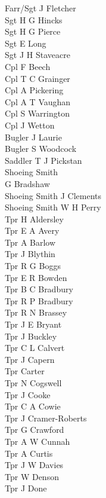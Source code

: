 \begin{multicols}{3}
  \small
  \noindent
  Farr/Sgt J Fletcher \\
  Sgt H G Hincks \\
  Sgt H G Pierce \\
  Sgt E Long \\
  Sgt J H Staveacre \\
  Cpl F Beech \\
  Cpl T C Grainger \\
  Cpl A Pickering \\
  Cpl A T Vaughan \\
  Cpl S Warrington \\
  Cpl J Wetton \\
  Bugler J Laurie \\
  Bugler S Woodcock \\
  Saddler T J Pickstan \\
  Shoeing Smith \\ \indent G Bradshaw \\
  Shoeing Smith J Clements \\
  Shoeing Smith W H Perry \\
  Tpr H Aldersley \\
  Tpr E A Avery \\
  Tpr A Barlow \\
  Tpr J Blythin \\
  Tpr R G Boggs \\
  Tpr E R Bowden \\
  Tpr B C Bradbury \\
  Tpr R P Bradbury \\
  Tpr R N Brassey \\
  Tpr J E Bryant \\
  Tpr J Buckley \\
  Tpr C L Calvert \\
  Tpr J Capern \\
  Tpr Carter \\
  Tpr N Cogswell \\
  Tpr J Cooke \\
  Tpr C A Cowie \\
  Tpr J Cramer-Roberts \\
  Tpr G Crawford \\
  Tpr A W Cunnah \\
  Tpr A Curtis \\
  Tpr J W Davies \\
  Tpr W Denson \\
  Tpr J Done \\

\end{multicols}
